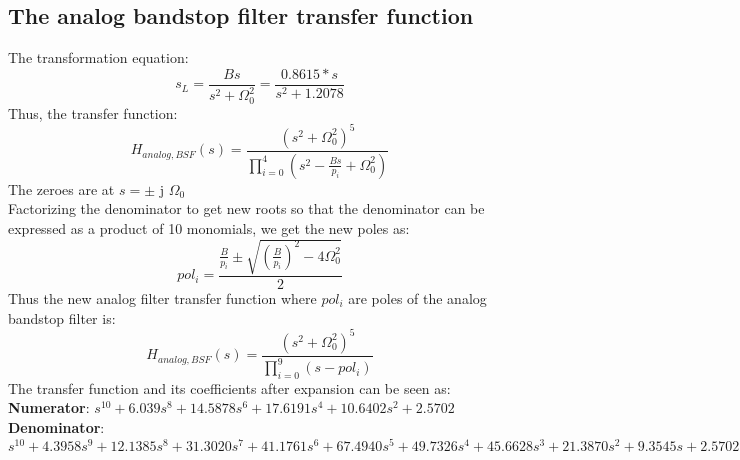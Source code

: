 \documentclass[12pt]{article}
\begin{document}
\subsection{The analog bandstop filter transfer function}
The transformation equation:
\begin{equation}
    s_L= \frac{Bs}{s^2+\Omega_{0}^2} = \frac{0.8615*s}{s^2+1.2078}
\end{equation}
Thus, the transfer function:
\begin{equation}
    H_{analog,BSF}(s)=\frac{(s^2+\Omega_{0}^2)^5}{\prod_{i=0}^{4}(s^2-\frac{Bs}{p_i}+\Omega_{0}^2)} 
\end{equation}
The zeroes are at $s=\pm$ j $ \Omega_0 $
\\Factorizing the denominator to get new roots so that the denominator can be expressed as a product of 10 monomials, we get the new poles as:
\begin{equation}
    pol_i=\frac{\frac{B}{p_i}\pm \sqrt{(\frac{B}{p_i})^2-4\Omega_{0}^2}}{2}
\end{equation}
Thus the new analog filter transfer function where $pol_i$ are poles of the analog bandstop filter is:
\begin{equation}
    H_{analog,BSF}(s)=\frac{(s^2+\Omega_{0}^2)^5}{\prod_{i=0}^{9}(s-pol_i)} 
\end{equation}
\newpage
The transfer function and its coefficients after expansion can be seen as:
\\\textbf{Numerator}: $s^{10}+6.039s^8+14.5878s^6+17.6191s^4+10.6402s^2+2.5702$
\\\textbf{Denominator}: $s^{10}+4.3958s^9+12.1385s^8+31.3020s^7+41.1761s^6+67.4940s^5+49.7326s^4+45.6628s^3+21.3870s^2+9.3545s+2.5702$
\end{document}
